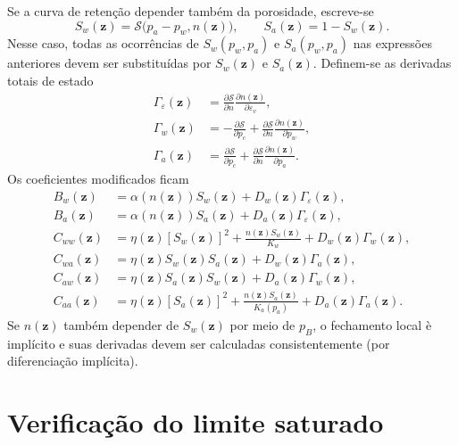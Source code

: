 \documentclass[11pt,a4paper]{article}
\begin{document}
Se a curva de reten\c{c}\~ao depender tamb\'em da porosidade, escreve-se
\begin{equation*}
\boxed{S_w(\mathbf z)=\mathcal S\bigl(p_a-p_w,n(\mathbf z)\bigr),
\qquad S_a(\mathbf z)=1-S_w(\mathbf z).}
\end{equation*}
Nesse caso, todas as ocorr\^encias de $S_w(p_w,p_a)$ e
$S_a(p_w,p_a)$ nas express\~oes anteriores devem ser substitu\'idas
por $S_w(\mathbf z)$ e $S_a(\mathbf z)$. Definem-se as derivadas totais
de estado
\begin{align*}
\Gamma_{\varepsilon}(\mathbf z)
&=\frac{\partial\mathcal S}{\partial n}
\frac{\partial n(\mathbf z)}{\partial\varepsilon_v},\\
\Gamma_w(\mathbf z)
&=-\frac{\partial\mathcal S}{\partial p_c}
+\frac{\partial\mathcal S}{\partial n}
\frac{\partial n(\mathbf z)}{\partial p_w},\\
\Gamma_a(\mathbf z)
&=\frac{\partial\mathcal S}{\partial p_c}
+\frac{\partial\mathcal S}{\partial n}
\frac{\partial n(\mathbf z)}{\partial p_a}.
\end{align*}
Os coeficientes modificados ficam
\begin{equation*}
\boxed{\begin{aligned}
B_w(\mathbf z)&=\alpha(n(\mathbf z))S_w(\mathbf z)
+D_w(\mathbf z)\Gamma_{\varepsilon}(\mathbf z),\\
B_a(\mathbf z)&=\alpha(n(\mathbf z))S_a(\mathbf z)
+D_a(\mathbf z)\Gamma_{\varepsilon}(\mathbf z),\\
C_{ww}(\mathbf z)&=\eta(\mathbf z)[S_w(\mathbf z)]^2
+\frac{n(\mathbf z)S_w(\mathbf z)}{K_w}
+D_w(\mathbf z)\Gamma_w(\mathbf z),\\
C_{wa}(\mathbf z)&=\eta(\mathbf z)S_w(\mathbf z)S_a(\mathbf z)
+D_w(\mathbf z)\Gamma_a(\mathbf z),\\
C_{aw}(\mathbf z)&=\eta(\mathbf z)S_a(\mathbf z)S_w(\mathbf z)
+D_a(\mathbf z)\Gamma_w(\mathbf z),\\
C_{aa}(\mathbf z)&=\eta(\mathbf z)[S_a(\mathbf z)]^2
+\frac{n(\mathbf z)S_a(\mathbf z)}{K_a(p_a)}
+D_a(\mathbf z)\Gamma_a(\mathbf z).
\end{aligned}}
\end{equation*}
Se $n(\mathbf z)$ tamb\'em depender de $S_w(\mathbf z)$ por meio de
$p_B$, o fechamento local \`e impl\'icito e suas derivadas devem ser
calculadas consistentemente (por diferencia\c{c}\~ao impl\'icita).

\section{Verifica\c{c}\~ao do limite saturado}
\end{document}
